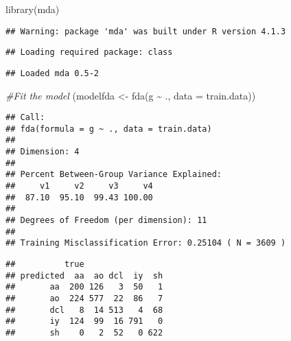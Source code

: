 \documentclass[
]{article}
\newenvironment{Shaded}{\begin{snugshade}}{\end{snugshade}}
\newcommand{\AttributeTok}[1]{\textcolor[rgb]{0.77,0.63,0.00}{#1}}
\newcommand{\CommentTok}[1]{\textcolor[rgb]{0.56,0.35,0.01}{\textit{#1}}}
\newcommand{\FunctionTok}[1]{\textcolor[rgb]{0.00,0.00,0.00}{#1}}
\newcommand{\NormalTok}[1]{#1}
\newcommand{\OtherTok}[1]{\textcolor[rgb]{0.56,0.35,0.01}{#1}}
\newcommand{\SpecialCharTok}[1]{\textcolor[rgb]{0.00,0.00,0.00}{#1}}
\begin{document}
\begin{Shaded}
\begin{Highlighting}[]
\FunctionTok{library}\NormalTok{(mda)}
\end{Highlighting}
\end{Shaded}

\begin{verbatim}
## Warning: package 'mda' was built under R version 4.1.3
\end{verbatim}

\begin{verbatim}
## Loading required package: class
\end{verbatim}

\begin{verbatim}
## Loaded mda 0.5-2
\end{verbatim}

\begin{Shaded}
\begin{Highlighting}[]
\CommentTok{\#Fit the model}
\NormalTok{(modelfda }\OtherTok{\textless{}{-}} \FunctionTok{fda}\NormalTok{(g }\SpecialCharTok{\textasciitilde{}}\NormalTok{ ., }\AttributeTok{data =}\NormalTok{ train.data))}
\end{Highlighting}
\end{Shaded}

\begin{verbatim}
## Call:
## fda(formula = g ~ ., data = train.data)
## 
## Dimension: 4 
## 
## Percent Between-Group Variance Explained:
##     v1     v2     v3     v4 
##  87.10  95.10  99.43 100.00 
## 
## Degrees of Freedom (per dimension): 11 
## 
## Training Misclassification Error: 0.25104 ( N = 3609 )
\end{verbatim}

\begin{Shaded}
\end{Shaded}

\begin{verbatim}
##          true
## predicted  aa  ao dcl  iy  sh
##       aa  200 126   3  50   1
##       ao  224 577  22  86   7
##       dcl   8  14 513   4  68
##       iy  124  99  16 791   0
##       sh    0   2  52   0 622
\end{verbatim}
\end{document}
